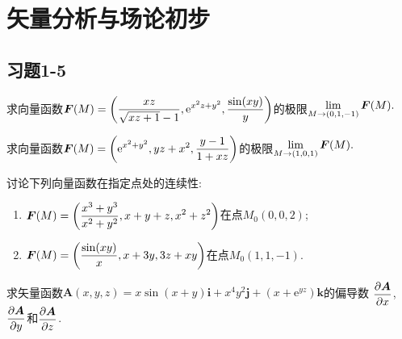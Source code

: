 

\chapter{矢量分析与场论初步}

\section{习题1-5}

\begin{yyEx}
	求向量函数$\begin{lgathered}
	\bm{F}(M) = \left( \frac{xz}{\sqrt{xz+1}-1}, \mathrm{e}^{x^2z+y^2},\frac{\sin(xy)}{y}\right)
	\end{lgathered}$的极限$\begin{lgathered}
	\lim\limits_{M\to(0,1,-1)}\bm{F}(M).
	\end{lgathered}$
\end{yyEx}

\begin{yyEx}
	求向量函数$\begin{lgathered}
	\bm{F}(M) = \left( \mathrm{e}^{x^2+y^2},yz+x^2,\frac{y-1}{1+xz} \right)
	\end{lgathered}$的极限$\begin{lgathered}
		\lim\limits_{M\to(1,0,1)}\bm{F}(M).
	\end{lgathered}$
\end{yyEx}

\begin{yyEx}
	讨论下列向量函数在指定点处的连续性:
	\begin{enumerate}
		\item $\begin{lgathered}
		\bm{F}(M) = \left( \frac{x^3+y^3}{x^2+y^2},x+y+z,x^2+z^2 \right)
		\end{lgathered}$在点$M_0(0,0,2)$;
		\item $\begin{lgathered}
		\bm{F}(M) = \left( \frac{\sin(xy)}{x},x+3y,3z+xy \right)
		\end{lgathered}$在点$M_0(1,1,-1)$.
	\end{enumerate}
\end{yyEx}

\begin{yyEx}
	求矢量函数$\bm{A}(x,y,z) = x\sin(x+y)\bm{i}+x^4y^2\bm{j}+(x+\mathrm{e}^{yz})\bm{k}$的偏导数 $\begin{lgathered}
		\frac{\partial \bm{A}}{\partial x}
	\end{lgathered}$,$\begin{lgathered}
	\frac{\partial \bm{A}}{\partial y}
	\end{lgathered}$和$\begin{lgathered}
	\frac{\partial \bm{A}}{\partial z}
	\end{lgathered}$.
\end{yyEx}


